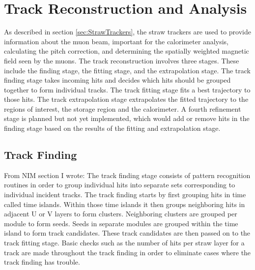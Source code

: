 
\thispagestyle{myheadings}

\graphicspath{{Body/Figures/TrackingFigures/}{Body/Figures/TrackingFigures/MainPlots/}{Body/Figures/TrackingFigures/MainPlots/PlanePlots/}{Body/Figures/TrackingFigures/MainPlots/PullPlots/}{Body/Figures/TrackingFigures/MainPlots/Residuals/}{Body/Figures/TrackingFigures/eLoss/}{Body/Figures/TrackingFigures/CoordSys/}{Body/Figures/TrackingFigures/TrackerPics/}{Body/Figures/TrackingFigures/Field/}{Body/Figures/TrackingFigures/TrackingFlow/}{Body/Figures/TrackingFigures/LeftRight/}{Body/Figures/TrackingFigures/Misc/}{Body/Figures/TrackingFigures/Extrapolation/}{Body/Figures/TrackingFigures/Tracks/}}

\chapter{Track Reconstruction and Analysis}
\label{chapter:TrackReconstruction}

As described in section \ref{sec:StrawTrackers}, the straw trackers are used to provide information about the muon beam, important for the calorimeter \wa analysis, calculating the \wa pitch correction, and determining the spatially weighted magnetic field seen by the muons. The track reconstruction involves three stages. These include the finding stage, the fitting stage, and the extrapolation stage. The track finding stage takes incoming hits and decides which hits should be grouped together to form individual tracks. The track fitting stage fits a best trajectory to those hits. The track extrapolation stage extrapolates the fitted trajectory to the regions of interest, the storage region and the calorimeter. A fourth refinement stage is planned but not yet implemented, which would add or remove hits in the finding stage based on the results of the fitting and extrapolation stage. 




\section{Track Finding}
\label{sec:TrackFinding}


From NIM section I wrote:
 The track finding stage consists of pattern recognition routines in order to group individual hits into separate sets corresponding to individual incident tracks. The track finding starts by first grouping hits in time called time islands. Within those time islands it then groups neighboring hits in adjacent U or V layers to form clusters. Neighboring clusters are grouped per module to form seeds. Seeds in separate modules are grouped within the time island to form track candidates. These track candidates are then passed on to the track fitting stage. Basic checks such as the number of hits per straw layer for a track are made throughout the track finding in order to eliminate cases where the track finding has trouble.



